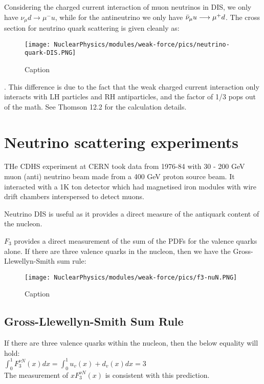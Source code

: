         Considering the charged current interaction of muon neutrinos in DIS, we only have $\nu_{\mu}d \longrightarrow \mu^- u$, while for the antineutrino we only have 
        $\Bar{\nu}_{\mu}u \longrightarrow \mu^+ d$. The cross section for neutrino quark scattering is given cleanly as:
        
            \begin{figure}[H]
                \centering
                \texttt{[image: NuclearPhysics/modules/weak-force/pics/neutrino-quark-DIS.PNG]}
            \caption{Caption}
            \end{figure}
            
        
        
        
        . This difference is due to the fact that the weak charged current interaction only interacts with LH particles and RH antiparticles, and the factor of 1/3 pops out of the math. See Thomson 12.2 for the calculation details.  
        
        
        \section{Neutrino scattering experiments}
            THe CDHS experiment at CERN took data from 1976-84 with 30 - 200 GeV muon (anti) neutrino beam made from a 400 GeV proton source beam. It interacted with a 1K ton detector which had magnetised iron modules with wire drift chambers interspersed to detect muons. 
            
            Neutrino DIS is useful as it provides a direct measure of the antiquark content of the nucleon. 
            
            $F_3$ provides a direct measurement of the sum of the PDFs for the valence quarks alone. If there are three valence quarks in the nucleon, then we  have the Gross-Llewellyn-Smith sum rule:
            
            \begin{figure}[H]
                \centering
                \texttt{[image: NuclearPhysics/modules/weak-force/pics/f3-nuN.PNG]}
            \caption{Caption}
            \end{figure}
            
            
                \subsection{Gross-Llewellyn-Smith Sum Rule}
        If there are three valence quarks within the nucleon, then the below equality will hold:\\
        $\int_{0}^{1} F_3^{\nu N}(x)dx = \int_{0}^{1}u_v(x) + d_v(x) dx = 3 $\\
        The measurement of $xF_3^{\nu N}(x)$ is consistent with this prediction. 
        
